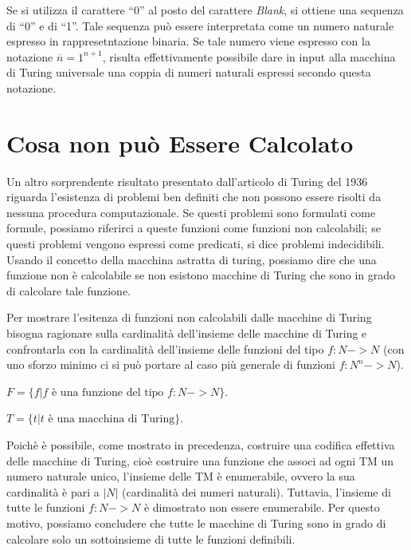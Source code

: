 Se si utilizza il carattere ``0'' al posto del carattere
\textit{Blank}, si ottiene una sequenza di ``0'' e di ``1''. Tale
sequenza pu\`o essere interpretata come un numero naturale espresso in
rappresetntazione binaria. Se tale numero viene espresso con la
notazione $\overline{n}=1^{n+1}$, risulta effettivamente possibile
dare in input alla macchina di Turing universale una coppia di numeri
naturali espressi secondo questa notazione.


\section{Cosa non pu\`o Essere Calcolato}
Un altro sorprendente risultato presentato dall'articolo di Turing del
1936 riguarda l'esistenza di problemi ben definiti che non possono
essere risolti da nessuna procedura computazionale. Se questi problemi
sono formulati come formule, possiamo riferirci a queste funzioni come
funzioni non calcolabili; se questi problemi vengono espressi come
predicati, si dice problemi indecidibili. Usando il concetto della
macchina astratta di turing, possiamo dire che una funzione non \`e
calcolabile se non esistono macchine di Turing che sono in grado di
calcolare tale funzione.

Per mostrare l'esitenza di funzioni non calcolabili dalle macchine di
Turing bisogna ragionare sulla cardinalit\`a dell'insieme delle
macchine di Turing e confrontarla con la cardinalit\`a dell'insieme
delle funzioni del tipo $f:N->N$ (con uno sforzo minimo ci si pu\`o
portare al caso pi\`u generale di funzioni $f:N^n->N$).

\begin{center}
$F = \{ f | f \textrm{ \`e una funzione del tipo } f:N->N \}.$
\end{center}

\vspace{10pt}

\begin{center}
$T = \{ t | t \textrm{ \`e una macchina di Turing} \}.$
\end{center}

\vspace{10pt}

Poich\`e \`e possibile, come mostrato in precedenza, costruire una
codifica effettiva delle macchine di Turing, cio\`e costruire una
funzione che associ ad ogni TM un numero naturale unico, l'insieme
delle TM \`e enumerabile, ovvero la sua cardinalit\`a \`e pari a $|N|$
(cardinalit\`a dei numeri naturali). Tuttavia, l'insieme di tutte le
funzioni $f:N->N$ \`e dimostrato non essere enumerabile. Per questo
motivo, possiamo concludere che tutte le macchine di Turing sono in
grado di calcolare solo un sottoinsieme di tutte le funzioni
definibili.

